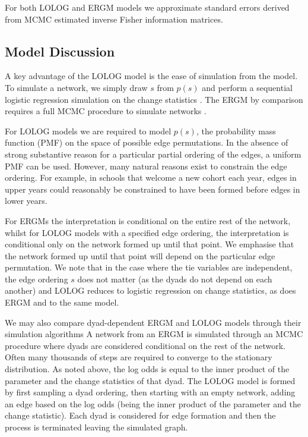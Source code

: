 \documentclass[
]{statsoc}
\begin{document}
For both LOLOG and ERGM models we approximate standard errors derived
from MCMC estimated inverse Fisher information matrices.

\subsection{Model Discussion}\label{sec:comparison}

A key advantage of the LOLOG model is the ease of simulation from the
model. To simulate a network, we simply draw \(s\) from \(p(s)\) and
perform a sequential logistic regression simulation on the change
statistics \citep{LOLOG_github}. The ERGM by comparison requires a full
MCMC procedure to simulate networks \citep{ergm_3_9_4}.

For LOLOG models we are required to model \(p(s)\), the probability mass
function (PMF) on the space of possible edge permutations. In the
absence of strong substantive reason for a particular partial ordering
of the edges, a uniform PMF can be used. However, many natural reasons
exist to constrain the edge ordering. For example, in schools that
welcome a new cohort each year, edges in upper years could reasonably be
constrained to have been formed before edges in lower years.

For ERGMs the interpretation is conditional on the entire rest of the
network, whilst for LOLOG models with a specified edge ordering, the
interpretation is conditional only on the network formed up until that
point. We emphasise that the network formed up until that point will
depend on the particular edge permutation. We note that in the case
where the tie variables are independent, the edge ordering \(s\) does
not matter (as the dyads do not depend on each another) and LOLOG
reduces to logistic regression on change statistics, as does ERGM and to
the same model.

We may also compare dyad-dependent ERGM and LOLOG models through their
simulation algorithms A network from an ERGM is simulated through an
MCMC procedure where dyads are considered conditional on the rest of the
network. Often many thousands of steps are required to converge to the
stationary distribution. As noted above, the log odds is equal to the
inner product of the parameter and the change statistics of that dyad.
The LOLOG model is formed by first sampling a dyad ordering, then
starting with an empty network, adding an edge based on the log odds
(being the inner product of the parameter and the change statistic).
Each dyad is considered for edge formation and then the process is
terminated leaving the simulated graph.
\end{document}
